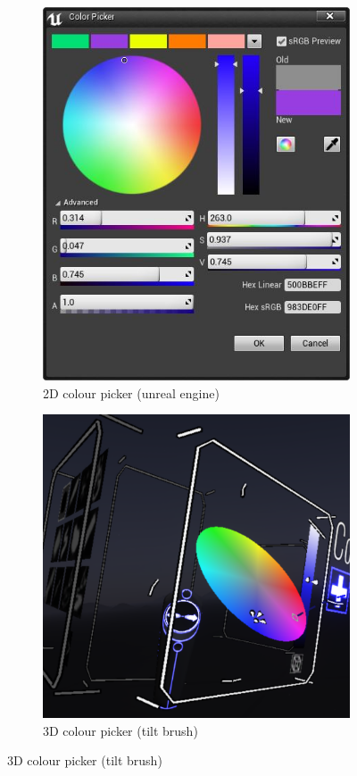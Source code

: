 \documentclass[11pt]{article}
\begin{document}
\begin{figure}
\centering
\begin{subfigure}{.5\textwidth}
  \centering
  \includegraphics[width=.85\linewidth]{2dui.jpg}
  \caption{2D colour picker (unreal engine)}
\end{subfigure}%
\begin{subfigure}{.5\textwidth}
  \centering
  \includegraphics[width=1\linewidth]{3dui.png}
  \caption{3D colour picker (tilt brush)}
\end{subfigure}
\end{figure}
\end{document}
